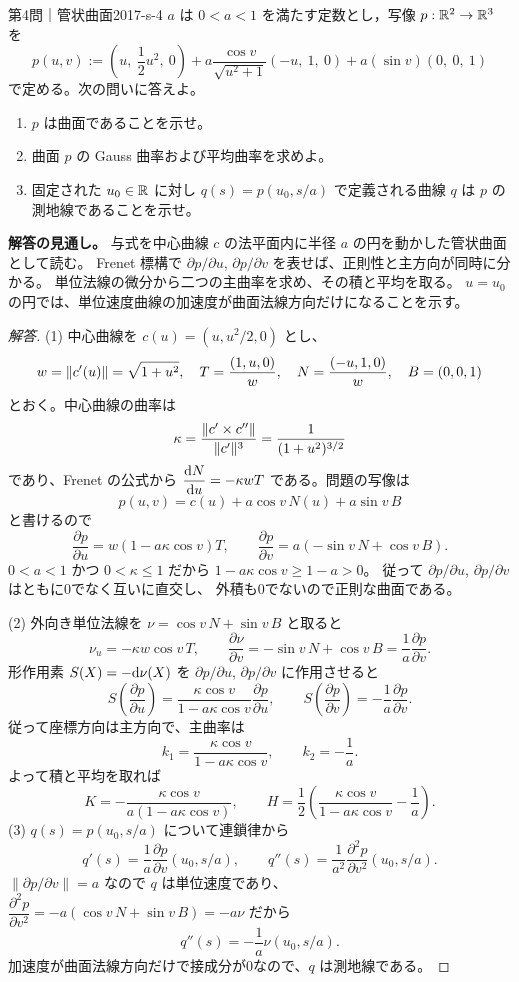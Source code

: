 \begin{problem}{第4問｜管状曲面}{2017-s-4}
$a$ は $0<a<1$ を満たす定数とし，写像 $p:\mathbb{R}^2\to\mathbb{R}^3$ を
\[
p(u,v):=\left(u,\ \frac12u^2,\ 0\right)
+a\frac{\cos v}{\sqrt{u^2+1}}(-u,\ 1,\ 0)
+a(\sin v)(0,\ 0,\ 1)
\]
で定める。次の問いに答えよ。
\begin{enumerate}
  \item[(1)] $p$ は曲面であることを示せ。
  \item[(2)] 曲面 $p$ の Gauss 曲率および平均曲率を求めよ。
  \item[(3)] 固定された $u_0\in\mathbb{R}$ に対し $q(s)=p(u_0,s/a)$ で定義される曲線 $q$ は $p$ の測地線であることを示せ。
\end{enumerate}
\end{problem}
\begin{memo*}
\textbf{解答の見通し。}
与式を中心曲線 $c$ の法平面内に半径 $a$ の円を動かした管状曲面として読む。
Frenet 標構で $\partial p/\partial u$, $\partial p/\partial v$ を表せば、正則性と主方向が同時に分かる。
単位法線の微分から二つの主曲率を求め、その積と平均を取る。
$u=u_0$ の円では、単位速度曲線の加速度が曲面法線方向だけになることを示す。
\end{memo*}
\begin{proof}[解答]
(1) 中心曲線を $c(u)=(u,u^2/2,0)$ とし、
\[
w=\lVert c'(u) \rVert=\sqrt{1+u^2},\quad
T=\frac{(1,u,0)}w,\quad
N=\frac{(-u,1,0)}w,\quad B=(0,0,1)
\]
とおく。中心曲線の曲率は
\[
\kappa=\frac{\lVert c'\times c'' \rVert}{\lVert c' \rVert^3}
=\frac1{(1+u^2)^{3/2}}
\]
であり、Frenet の公式から $\dfrac{\mathrm{d} N}{\mathrm{d} u}=-\kappa wT$ である。問題の写像は
\[
p(u,v)=c(u)+a\cos v\,N(u)+a\sin v\,B
\]
と書けるので
\[
\frac{\partial p}{\partial u}=w(1-a\kappa\cos v)T,
\qquad \frac{\partial p}{\partial v}=a(-\sin v\,N+\cos v\,B).
\]
$0<a<1$ かつ $0<\kappa\le1$ だから $1-a\kappa\cos v\ge1-a>0$。
従って $\partial p/\partial u$, $\partial p/\partial v$ はともに0でなく互いに直交し、
外積も0でないので正則な曲面である。

(2) 外向き単位法線を $\nu=\cos v\,N+\sin v\,B$ と取ると
\[
\nu_u=-\kappa w\cos v\,T,
\qquad \frac{\partial\nu}{\partial v}=-\sin v\,N+\cos v\,B=\frac1a\frac{\partial p}{\partial v}.
\]
形作用素 $S(X)=-\mathrm{d}\nu(X)$ を $\partial p/\partial u$, $\partial p/\partial v$ に作用させると
\[
S\!\left(\frac{\partial p}{\partial u}\right)
=\frac{\kappa\cos v}{1-a\kappa\cos v}\frac{\partial p}{\partial u},
\qquad S\!\left(\frac{\partial p}{\partial v}\right)=-\frac1a\frac{\partial p}{\partial v}.
\]
従って座標方向は主方向で、主曲率は
\[
k_1=\frac{\kappa\cos v}{1-a\kappa\cos v},\qquad k_2=-\frac1a.
\]
よって積と平均を取れば
\[
K=-\frac{\kappa\cos v}{a(1-a\kappa\cos v)},\qquad
H=\frac12\left(\frac{\kappa\cos v}{1-a\kappa\cos v}-\frac1a\right).
\]
(3) $q(s)=p(u_0,s/a)$ について連鎖律から
\[
q'(s)=\frac1a\frac{\partial p}{\partial v}(u_0,s/a),\qquad
q''(s)=\frac1{a^2}\frac{\partial^2p}{\partial v^2}(u_0,s/a).
\]
$\left\|\partial p/\partial v\right\|=a$ なので $q$ は単位速度であり、
$\dfrac{\partial^2p}{\partial v^2}=-a(\cos v\,N+\sin v\,B)=-a\nu$ だから
\[
q''(s)=-\frac1a\nu(u_0,s/a).
\]
加速度が曲面法線方向だけで接成分が0なので、$q$ は測地線である。
\end{proof}

